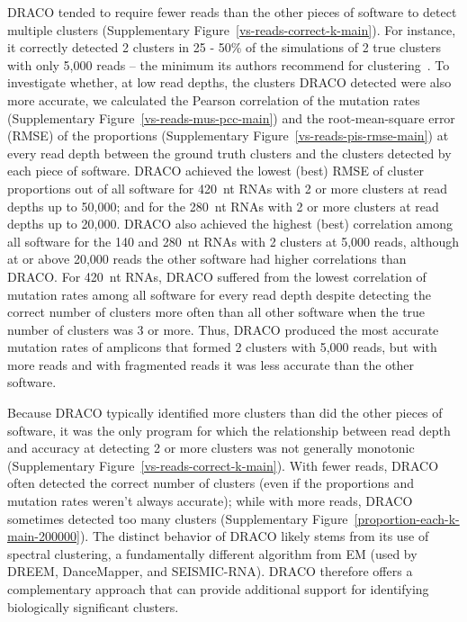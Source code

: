 \documentclass[11pt]{article}
\begin{document}
DRACO tended to require fewer reads than the other pieces of software to detect multiple clusters (Supplementary Figure~\ref{vs-reads-correct-k-main}).
For instance, it correctly detected 2 clusters in 25 - 50\% of the simulations of 2 true clusters with only 5,000 reads -- the minimum its authors recommend for clustering~\cite{Morandi2021}.
To investigate whether, at low read depths, the clusters DRACO detected were also more accurate, we calculated the Pearson correlation of the mutation rates (Supplementary Figure~\ref{vs-reads-mus-pcc-main}) and the root-mean-square error (RMSE) of the proportions (Supplementary Figure~\ref{vs-reads-pis-rmse-main}) at every read depth between the ground truth clusters and the clusters detected by each piece of software.
DRACO achieved the lowest (best) RMSE of cluster proportions out of all software for 420~nt RNAs with 2 or more clusters at read depths up to 50,000; and for the 280~nt RNAs with 2 or more clusters at read depths up to 20,000.
DRACO also achieved the highest (best) correlation among all software for the 140 and 280~nt RNAs with 2 clusters at 5,000 reads, although at or above 20,000 reads the other software had higher correlations than DRACO.
For 420~nt RNAs, DRACO suffered from the lowest correlation of mutation rates among all software for every read depth despite detecting the correct number of clusters more often than all other software when the true number of clusters was 3 or more.
Thus, DRACO produced the most accurate mutation rates of amplicons that formed 2 clusters with 5,000 reads, but with more reads and with fragmented reads it was less accurate than the other software.

Because DRACO typically identified more clusters than did the other pieces of software, it was the only program for which the relationship between read depth and accuracy at detecting 2 or more clusters was not generally monotonic (Supplementary Figure~\ref{vs-reads-correct-k-main}).
With fewer reads, DRACO often detected the correct number of clusters (even if the proportions and mutation rates weren’t always accurate); while with more reads, DRACO sometimes detected too many clusters (Supplementary Figure~\ref{proportion-each-k-main-200000}).
The distinct behavior of DRACO likely stems from its use of spectral clustering, a fundamentally different algorithm from EM (used by DREEM, DanceMapper, and SEISMIC-RNA).
DRACO therefore offers a complementary approach that can provide additional support for identifying biologically significant clusters.
\end{document}
